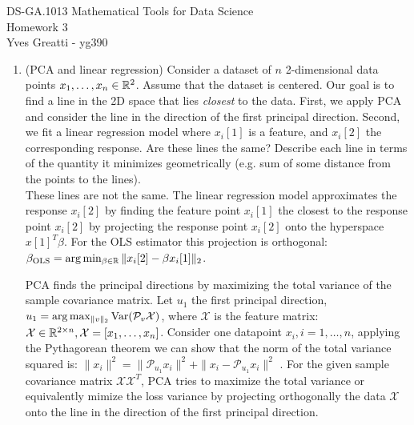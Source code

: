 \documentclass[12pt,twoside]{article}
\begin{document}
\noindent DS-GA.1013 Mathematical Tools for Data Science \\
Homework 3 \\
Yves Greatti - yg390\\

\begin{enumerate}
\item (PCA and linear regression) Consider a dataset of $n$ 2-dimensional data points $x_1,\ldots,x_n \in \mathbb{R}^2$. Assume that the dataset is centered. Our goal is to find a line in the 2D space that lies \emph{closest} to the data. First, we apply PCA and consider the line in the direction of the first principal direction. Second, we fit a linear regression model where $x_i[1]$ is a feature, and $x_i[2]$ the corresponding response. Are these lines the same? Describe each line in terms of the quantity it minimizes geometrically (e.g. sum of some distance from the points to the lines).\\

	These lines are not the same. The linear regression model approximates the response $x_i[2]$ by  finding the feature point  $x_i[1]$  the closest to the response point $x_i[2]$ by projecting the response point $x_i[2]$
	onto the hyperspace $x[1]^T \beta $. For the OLS estimator this projection is orthogonal: $\beta_{\text{OLS}} =  \arg \min_{\beta \in \mathbb{R}} \| x_i[2] - \beta x_i[1] \|_2$.
	
	PCA finds the principal directions by maximizing the total variance of the sample covariance matrix.
	Let $u_1$ the first principal direction, $u_1 = \arg \max_{\|v\|_2} \var(\mathcal{P}_v \mathcal{X})$, where $\mathcal{X}$ is the feature matrix: $\mathcal{X} \in \mathbb{R}^{2 \times n}, \mathcal{X} = [ x_1,\ldots,x_n ]$.
	Consider one datapoint $x_i, i=1, \ldots,n$, applying the Pythagorean theorem we can show that the norm of the total variance squared is: 
	$\|x_i\|^2 = \| \mathcal{P}_{u_1} x_i\|^2 + \| x_i - \mathcal{P}_{u_1} x_i \|^2$ .
	For the given sample covariance  matrix $\mathcal{X} \mathcal{X}^T$, PCA tries to maximize the total variance or equivalently mimize the loss variance by projecting orthogonally the data  $\mathcal{X}$ onto the  line  in the direction of the first principal direction.
	


\end{enumerate}
\end{document}
